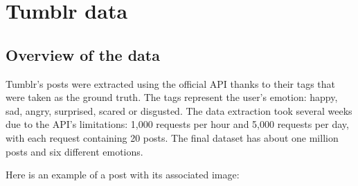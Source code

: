 \chapter{Tumblr data}

\section{Overview of the data}
Tumblr's posts were extracted using the official API thanks to their tags that were taken as the ground truth. The tags represent the user's emotion: happy, sad, angry, surprised, scared or disgusted. The data extraction took several weeks due to the API's limitations: 1,000 requests per hour and 5,000 requests per day, with each request containing 20 posts. The final dataset has about one million posts and six different emotions.

Here is an example of a post with its associated image:
